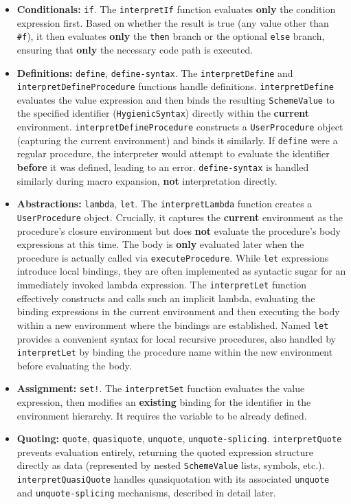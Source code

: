 \documentclass[final]{cmpreport_02}
\begin{document}
\begin{itemize}
    \item \textbf{Conditionals:} \texttt{if}. The \texttt{interpretIf} function evaluates \textbf{only} the condition expression first. Based on whether the result is true (any value other than \texttt{\#f}), it then evaluates \textbf{only} the \texttt{then} branch or the optional \texttt{else} branch, ensuring that \textbf{only} the necessary code path is executed.
    \item \textbf{Definitions:} \texttt{define}, \texttt{define-syntax}. The \texttt{interpretDefine} and \texttt{interpretDefineProcedure} functions handle definitions. \texttt{interpretDefine} evaluates the value expression and then binds the resulting \texttt{SchemeValue} to the specified identifier (\texttt{HygienicSyntax}) directly within the \textbf{current} environment. \texttt{interpretDefineProcedure} constructs a \texttt{UserProcedure} object (capturing the current environment) and binds it similarly. If \texttt{define} were a regular procedure, the interpreter would attempt to evaluate the identifier \textbf{before} it was defined, leading to an error. \texttt{define-syntax} is handled similarly during macro expansion, \textbf{not} interpretation directly.
    \item \textbf{Abstractions:} \texttt{lambda}, \texttt{let}. The \texttt{interpretLambda} function creates a \texttt{UserProcedure} object. Crucially, it captures the \textbf{current} environment as the procedure's closure environment but does \textbf{not} evaluate the procedure's body expressions at this time. The body is \textbf{only} evaluated later when the procedure is actually called via \texttt{executeProcedure}. While \texttt{let} expressions introduce local bindings, they are often implemented as syntactic sugar for an immediately invoked lambda expression. The \texttt{interpretLet} function effectively constructs and calls such an implicit lambda, evaluating the binding expressions in the current environment and then executing the body within a new environment where the bindings are established. Named \texttt{let} provides a convenient syntax for local recursive procedures, also handled by \texttt{interpretLet} by binding the procedure name within the new environment before evaluating the body.
    \item \textbf{Assignment:} \texttt{set!}. The \texttt{interpretSet} function evaluates the value expression, then modifies an \textbf{existing} binding for the identifier in the environment hierarchy. It requires the variable to be already defined.
    \item \textbf{Quoting:} \texttt{quote}, \texttt{quasiquote}, \texttt{unquote}, \texttt{unquote-splicing}. \texttt{interpretQuote} prevents evaluation entirely, returning the quoted expression structure directly as data (represented by nested \texttt{SchemeValue} lists, symbols, etc.). \texttt{interpretQuasiQuote} handles quasiquotation with its associated \texttt{unquote} and \texttt{unquote-splicing} mechanisms, described in detail later.
\end{itemize}
\end{document}

